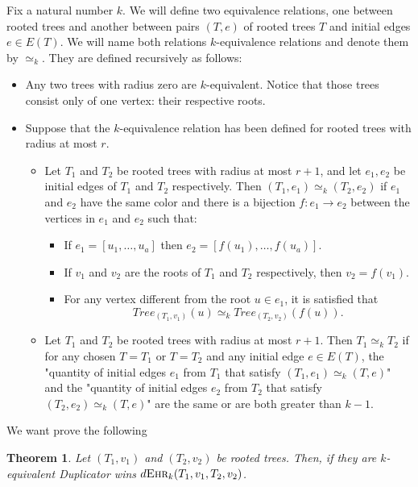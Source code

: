 \documentclass[12pt,notitlepage,a4paper]{article}
\newtheorem{theorem}{Theorem}[section]
\theoremstyle{definition}
\newcommand{\morph}[1]{\simeq_#1}
\newcommand{\ehr}{\textsc{Ehr}}
\begin{document}
Fix a natural number $k$. We will define 
two equivalence relations, one between 
rooted trees and another between pairs
$(T,e)$ of rooted trees $T$ and initial edges
$e\in E(T)$. We will name both relations
$k$-equivalence relations and
denote them by $\morph{k}$. 
They are defined recursively as follows:

\begin{itemize}
	\item Any two trees with radius zero are $k$-equivalent.
	Notice that those trees
	consist only of one vertex: their respective roots.
	\item Suppose that the $k$-equivalence relation has been
	defined for rooted trees with radius at most $r$.
	\begin{itemize}
		\item Let $T_1$ and $T_2$ be rooted trees with radius
		at most $r+1$, and let $e_1, e_2$
		be initial edges of $T_1$ and $T_2$ respectively.
		Then $(T_1,e_1)\simeq_k (T_2,e_2)$ if
		$e_1$ and $e_2$ have the same color and there is a bijection 
		$f: e_1\rightarrow e_2$ between the vertices in $e_1$ and
		$e_2$ such that:
		\begin{itemize}
			\item If $e_1=[u_1,\dots, u_a]$ then $e_2=[f(u_1),\dots,f(u_a)]$.
			\item If $v_1$ and $v_2$ are the roots of
			$T_1$ and $T_2$ respectively, then $v_2=f(v_1)$.
			\item For any vertex different from the root $u\in e_1$, it is satisfied that
			\[Tree_{(T_1,v_1)}(u)\morph{k} Tree_{(T_2,v_2)}(f(u)).\]
		\end{itemize}
		\item Let $T_1$ and $T_2$ be rooted trees with
		radius at most $r+1$. Then $T_1\morph{k} T_2$ if
		for any chosen $T=T_1$ or $T=T_2$ and any initial edge
		$e\in E(T)$, the "quantity 
		of initial edges $e_1$ from $T_1$ that satisfy
		$(T_1,e_1)\simeq_k (T, e)$" and the "quantity 
		of initial edges $e_2$ from $T_2$ that satisfy
		$(T_2,e_2)\simeq_k (T, e)$" are the same or 
		are both greater than $k-1$.
		
	\end{itemize}
\end{itemize}

We want prove the following
\begin{theorem} \label{thm:equivalenttrees} 
	Let $(T_1,v_1)$ and $(T_2,v_2)$ be rooted trees.
	Then, if they are $k$-equivalent Duplicator wins
	$d\ehr_{k}(T_1,v_1,T_2,v_2)$.
\end{theorem}
\end{document}
